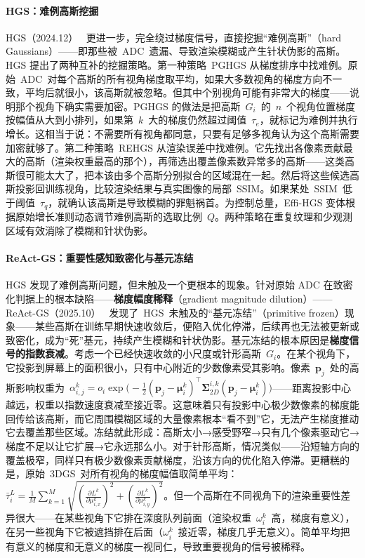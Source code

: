 \paragraph{HGS：难例高斯挖掘}
HGS（2024.12）~\cite{2412_04826} 更进一步，完全绕过梯度信号，直接挖掘``难例高斯''（hard Gaussians）——即那些被~ADC~遗漏、导致渲染模糊或产生针状伪影的高斯。HGS 提出了两种互补的挖掘策略。第一种策略~PGHGS 从梯度排序中找难例。原始~ADC~对每个高斯的所有视角梯度取平均，如果大多数视角的梯度方向不一致，平均后就很小，该高斯就被忽略。但其中个别视角可能有非常大的梯度——说明那个视角下确实需要加密。PGHGS 的做法是把高斯~$G_i$~的~$n$~个视角位置梯度按幅值从大到小排列，如果第~$k$~大的梯度仍然超过阈值~$\tau_e$，就标记为难例并执行增长。这相当于说：不需要所有视角都同意，只要有足够多视角认为这个高斯需要加密就够了。第二种策略~REHGS 从渲染误差中找难例。它先找出各像素贡献最大的高斯（渲染权重最高的那个），再筛选出覆盖像素数异常多的高斯——这类高斯很可能太大了，把本该由多个高斯分别拟合的区域混在一起。然后将这些候选高斯投影回训练视角，比较渲染结果与真实图像的局部~SSIM。如果某处~SSIM~低于阈值~$\tau_q$，就确认该高斯是导致模糊的罪魁祸首。为控制总量，Effi-HGS 变体根据原始增长准则动态调节难例高斯的选取比例~$Q$。两种策略在重复纹理和少观测区域有效消除了模糊和针状伪影。

\paragraph{ReAct-GS：重要性感知致密化与基元冻结}
HGS 发现了难例高斯问题，但未触及一个更根本的现象。针对原始 ADC 在致密化判据上的根本缺陷——\textbf{梯度幅度稀释}（gradient magnitude dilution）——ReAct-GS（2025.10）~\cite{2510_19653} 发现了~HGS~未触及的``基元冻结''（primitive frozen）现象——某些高斯在训练早期快速收敛后，便陷入优化停滞，后续再也无法被更新或致密化，成为``死''基元，持续产生模糊和针状伪影。基元冻结的根本原因是\textbf{梯度信号的指数衰减}。考虑一个已经快速收敛的小尺度或针形高斯~$G_i$。在某个视角下，它投影到屏幕上的面积很小，只有中心附近的少数像素受其影响。像素~$\mathbf{p}_j$~处的高斯影响权重为~$\alpha_{i,j}^k = o_i \exp\!\bigl(-\tfrac{1}{2}(\mathbf{p}_j - \boldsymbol{\mu}_i^k)^\top \boldsymbol{\Sigma}_{2D}^{i,k}(\mathbf{p}_j - \boldsymbol{\mu}_i^k)\bigr)$——距离投影中心越远，权重以指数速度衰减至接近零。这意味着只有投影中心极少数像素的梯度能回传给该高斯，而它周围模糊区域的大量像素根本``看不到''它，无法产生梯度推动它去覆盖那些区域。冻结就此形成：高斯太小→感受野窄→只有几个像素驱动它→梯度不足以让它扩展→它永远那么小。对于针形高斯，情况类似——沿短轴方向的覆盖极窄，同样只有极少数像素贡献梯度，沿该方向的优化陷入停滞。更糟糕的是，原始~3DGS~对所有视角的梯度幅值取简单平均：$\bar{\tau}_i^L = \frac{1}{M}\sum_{k=1}^{M}\sqrt{(\frac{\partial L^k}{\partial\mu_{i,x}^k})^2 + (\frac{\partial L^k}{\partial\mu_{i,y}^k})^2}$。但一个高斯在不同视角下的渲染重要性差异很大——在某些视角下它排在深度队列前面（渲染权重~$\omega_i^k$~高，梯度有意义），在另一些视角下它被遮挡排在后面（$\omega_i^k$~接近零，梯度几乎无意义）。简单平均把有意义的梯度和无意义的梯度一视同仁，导致重要视角的信号被稀释。

